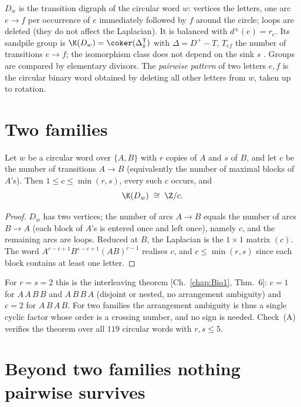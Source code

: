 $D_w$ is the transition digraph of the circular word $w$: vertices the letters, one arc
$e\to f$ per occurrence of $e$ immediately followed by $f$ around the circle; loops are
deleted (they do not affect the Laplacian). It is balanced with $d^{\pm}(e)=r_e$. Its
sandpile group is $\K(D_w)=\coker(\Delta_{\hat s}^{\mathsf T})$ with $\Delta=D^{+}-T$,
$T_{ef}$ the number of transitions $e\to f$; the isomorphism class does not depend on the
sink $s$ \cite[Lem.~4.12]{HLMPPW}. Groups are compared by elementary divisors. The
\emph{pairwise pattern} of two letters $e,f$ is the circular binary word obtained by
deleting all other letters from $w$, taken up to rotation.

\section{Two families}\label{Bio4:sec:two}

\begin{theorem}\label{Bio4:thm:two}
Let $w$ be a circular word over $\{A,B\}$ with $r$ copies of $A$ and $s$ of $B$, and let
$c$ be the number of transitions $A\to B$ (equivalently the number of maximal blocks of
$A$'s). Then $1\le c\le\min(r,s)$, every such $c$ occurs, and
\[
\K(D_w)\;\cong\;\Z/c .
\]
\end{theorem}

\begin{proof}
$D_w$ has two vertices; the number of arcs $A\to B$ equals the number of arcs $B\to A$
(each block of $A$'s is entered once and left once), namely $c$, and the remaining arcs
are loops. Reduced at $B$, the Laplacian is the $1\times1$ matrix $(c)$. The word
$A^{r-c+1}B^{s-c+1}(AB)^{c-1}$ realises $c$, and $c\le\min(r,s)$ since each block
contains at least one letter.
\end{proof}

For $r=s=2$ this is the interleaving theorem [Ch.~\ref{chap:Bio1}, Thm.~6]: $c=1$ for
$A\,A\,B\,B$ and $A\,B\,B\,A$ (disjoint or nested, no arrangement ambiguity) and $c=2$
for $A\,B\,A\,B$. For two families the arrangement ambiguity is thus a single cyclic
factor whose order is a crossing number, and no sign is needed. Check~(A) verifies the
theorem over all $119$ circular words with $r,s\le5$.

\section{Beyond two families nothing pairwise survives}\label{Bio4:sec:neg}

